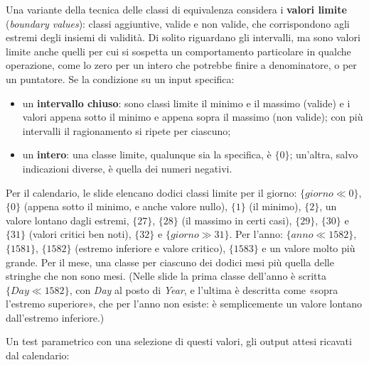 Una variante della tecnica delle classi di equivalenza considera i \textbf{valori limite} (\textit{boundary values}):
classi aggiuntive, valide e non valide, che corrispondono agli estremi degli insiemi di validità. Di solito riguardano
gli intervalli, ma sono valori limite anche quelli per cui si sospetta un comportamento particolare in qualche
operazione, come lo zero per un intero che potrebbe finire a denominatore, o per un puntatore. Se la condizione su un
input specifica:

\begin{itemize}
  \item un \textbf{intervallo chiuso}: sono classi limite il minimo e il massimo (valide) e i valori appena sotto il
        minimo e appena sopra il massimo (non valide); con più intervalli il ragionamento si ripete per ciascuno;
  \item un \textbf{intero}: una classe limite, qualunque sia la specifica, è \(\{0\}\); un'altra, salvo indicazioni
        diverse, è quella dei numeri negativi.
\end{itemize}

Per il calendario, le slide elencano dodici classi limite per il giorno: \(\{giorno \ll 0\}\), \(\{0\}\) (appena sotto
il minimo, e anche valore nullo), \(\{1\}\) (il minimo), \(\{2\}\), un valore lontano dagli estremi, \(\{27\}\),
\(\{28\}\) (il massimo in certi casi), \(\{29\}\), \(\{30\}\) e \(\{31\}\) (valori critici ben noti), \(\{32\}\) e
\(\{giorno \gg 31\}\). Per l'anno: \(\{anno \ll 1582\}\), \(\{1581\}\), \(\{1582\}\) (estremo inferiore e valore
critico), \(\{1583\}\) e un valore molto più grande. Per il mese, una classe per ciascuno dei dodici mesi più quella
delle stringhe che non sono mesi. (Nelle slide la prima classe dell'anno è scritta \(\{Day \ll 1582\}\), con
\textit{Day} al posto di \textit{Year}, e l'ultima è descritta come «sopra l'estremo superiore», che per l'anno non
esiste: è semplicemente un valore lontano dall'estremo inferiore.)

Un test parametrico con una selezione di questi valori, gli output attesi ricavati dal calendario:

